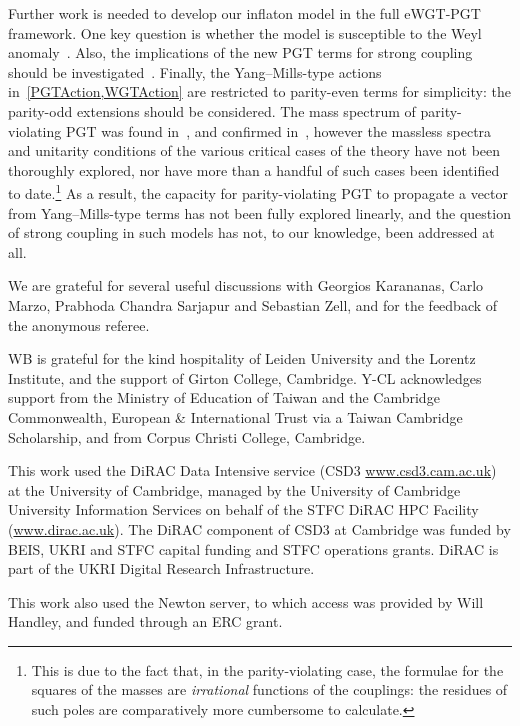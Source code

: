 \documentclass[aps,prd,reprint,preprintnumbers,showpacs,floatfix,nofootinbib,superscript address]{revtex4-2}
\begin{document}
Further work is needed to develop our inflaton model in the full eWGT-PGT framework. One key question is whether the model is susceptible to the Weyl anomaly~\cite{Capper:1974ic}. Also, the implications of the new PGT terms for strong coupling should be investigated~\cite{Barker:2022kdk}. Finally, the Yang--Mills-type actions in~\cref{PGTAction,WGTAction} are restricted to parity-even terms for simplicity: the parity-odd extensions should be considered. The mass spectrum of parity-violating PGT was found in~\cite{Karananas:2014pxa}, and confirmed in~\cite{Blagojevic:2018dpz}, however the massless spectra and unitarity conditions of the various critical cases of the theory have not been thoroughly explored, nor have more than a handful of such cases been identified to date.\footnote{This is due to the fact that, in the parity-violating case, the formulae for the squares of the masses are \emph{irrational} functions of the couplings: the residues of such poles are comparatively more cumbersome to calculate.} As a result, the capacity for parity-violating PGT to propagate a vector from Yang--Mills-type terms has not been fully explored linearly, and the question of strong coupling in such models has not, to our knowledge, been addressed at all.

\vspace*{-0.3cm}
\begin{acknowledgements}

We are grateful for several useful discussions with Georgios Karananas, Carlo Marzo, Prabhoda Chandra Sarjapur and Sebastian Zell, and for the feedback of the anonymous referee.

WB is grateful for the kind hospitality of Leiden University and the Lorentz Institute, and the support of Girton College, Cambridge. Y-CL acknowledges support from the Ministry of Education of Taiwan and the Cambridge Commonwealth, European \& International Trust via a Taiwan Cambridge Scholarship, and from Corpus Christi College, Cambridge.

This work used the DiRAC Data Intensive service (CSD3 \href{www.csd3.cam.ac.uk}{www.csd3.cam.ac.uk}) at the University of Cambridge, managed by the University of Cambridge University Information Services on behalf of the STFC DiRAC HPC Facility (\href{www.dirac.ac.uk}{www.dirac.ac.uk}). The DiRAC component of CSD3 at Cambridge was funded by BEIS, UKRI and STFC capital funding and STFC operations grants. DiRAC is part of the UKRI Digital Research Infrastructure.

This work also used the Newton server, to which access was provided by Will Handley, and funded through an ERC grant.

\end{acknowledgements}
\end{document}
